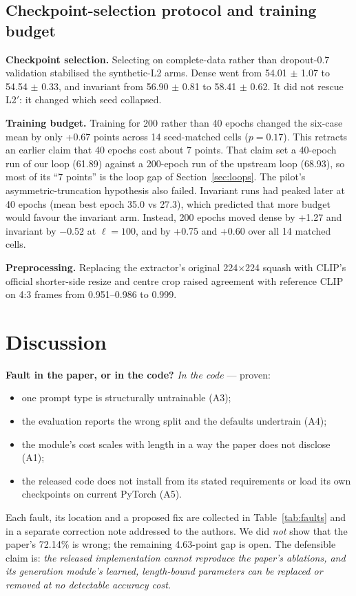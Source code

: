 \documentclass[lettersize,journal]{IEEEtran}
\begin{document}
\subsection{Checkpoint-selection protocol and training budget}
\textbf{Checkpoint selection.} Selecting on complete-data rather than dropout-0.7 validation stabilised the synthetic-L2 arms. Dense went from 54.01 $\pm$ 1.07 to 54.54 $\pm$ 0.33, and invariant from 56.90 $\pm$ 0.81 to 58.41 $\pm$ 0.62. It did not rescue L2$'$: it changed which seed collapsed.

\textbf{Training budget.} Training for 200 rather than 40 epochs changed the six-case mean by only +0.67 points across 14 seed-matched cells ($p=0.17$). This retracts an earlier claim that 40 epochs cost about 7 points. That claim set a 40-epoch run of our loop (61.89) against a 200-epoch run of the upstream loop (68.93), so most of its ``7 points'' is the loop gap of Section~\ref{sec:loops}. The pilot's asymmetric-truncation hypothesis also failed. Invariant runs had peaked later at 40 epochs (mean best epoch 35.0 vs 27.3), which predicted that more budget would favour the invariant arm. Instead, 200 epochs moved dense by +1.27 and invariant by $-$0.52 at $\ell=100$, and by +0.75 and +0.60 over all 14 matched cells.

\textbf{Preprocessing.} Replacing the extractor's original 224$\times$224 squash with CLIP's official shorter-side resize and centre crop raised agreement with reference CLIP on 4:3 frames from 0.951--0.986 to 0.999.

\section{Discussion}
\textbf{Fault in the paper, or in the code?} \emph{In the code} --- proven:
\begin{itemize}
\item one prompt type is structurally untrainable (A3);
\item the evaluation reports the wrong split and the defaults undertrain (A4);
\item the module's cost scales with length in a way the paper does not disclose (A1);
\item the released code does not install from its stated requirements or load its own checkpoints on current PyTorch (A5).
\end{itemize}
Each fault, its location and a proposed fix are collected in Table~\ref{tab:faults} and in a separate correction note addressed to the authors.
We did \emph{not} show that the paper's 72.14\% is wrong; the remaining 4.63-point gap is open. The defensible claim is: \emph{the released implementation cannot reproduce the paper's ablations, and its generation module's learned, length-bound parameters can be replaced or removed at no detectable accuracy cost.}
\end{document}
